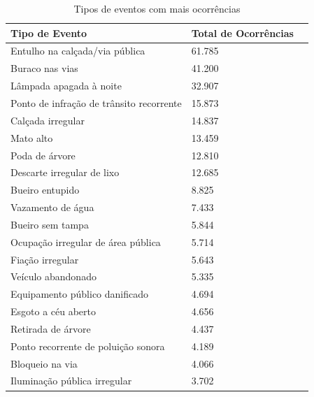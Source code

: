 \begin{table}[h]
	\centering
	\caption{Tipos de eventos com mais ocorrências}
	\label{tab:tiposevento}
	\begin{tabularx}{\textwidth}{|X|l|l|}
		\hline
		\textbf{Tipo de Evento}                  & \textbf{Total de Ocorrências} \\
		\hline
		Entulho na calçada/via pública           & 61.785                        \\
		Buraco nas vias                          & 41.200                        \\
		Lâmpada apagada à noite                  & 32.907                        \\
		Ponto de infração de trânsito recorrente & 15.873                        \\
		Calçada irregular                        & 14.837                        \\
		Mato alto                                & 13.459                        \\
		Poda de árvore                           & 12.810                        \\
		Descarte irregular de lixo               & 12.685                        \\
		Bueiro entupido                          & 8.825                         \\
		Vazamento de água                        & 7.433                         \\
		Bueiro sem tampa                         & 5.844                         \\
		Ocupação irregular de área pública       & 5.714                         \\
		Fiação irregular                         & 5.643                         \\
		Veículo abandonado                       & 5.335                         \\
		Equipamento público danificado           & 4.694                         \\
		Esgoto a céu aberto                      & 4.656                         \\
		Retirada de árvore                       & 4.437                         \\
		Ponto recorrente de poluição sonora      & 4.189                         \\
		Bloqueio na via                          & 4.066                         \\
		Iluminação pública irregular             & 3.702                         \\
		\hline
	\end{tabularx}
\end{table}

